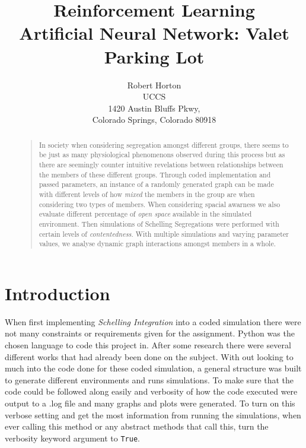 \documentclass[letterpaper]{article}
\begin{document}
%
\title{Reinforcement Learning\\ Artificial Neural Network: Valet Parking Lot }
\author{Robert Horton\\
UCCS\\
1420 Austin Bluffs Pkwy,\\
Colorado Springs, Colorado 80918\\
}
\maketitle

\begin{abstract}
\begin{quote}
In society when considering segregation amongst different groups, there seems to be just as many physiological phenomenons observed during this process but as there are seemingly counter intuitive revelations between relationships between the members of these different groups. Through coded implementation and passed parameters, an instance of a randomly generated graph can be made with different levels of how \textit{mixed} the members in the group are when considering two types of members.  When considering spacial awarness we also evaluate different percentage of \textit{open space} available in the simulated environment.  Then simulations of Schelling Segregations were performed with certain levels of \textit{contentedness}.  With multiple simulations and varying parameter values, we analyse dynamic graph interactions amongst members in a whole.
\end{quote}
\end{abstract}

\section{Introduction}

When first implementing \textit{Schelling Integration} into a coded simulation there were not many constraints or requirements given for the assignment.  Python was the chosen language to code this project in.   After some research there were several different works that had already been done on the subject.  With out looking to much into the code done for these coded simulation, a general structure was built to generate different environments and runs simulations.  To make sure that the code could be followed along easily and verbosity of how the code executed were output to a .log file and many graphs and plots were generated.  To turn on this verbose setting and get the most information from running the simulations, when ever calling this method or any abstract methods that call this, turn the verbosity keyword argument to \texttt{True}.\\
\end{document}
